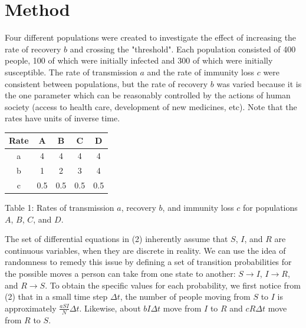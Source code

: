 \documentclass[prb,aps,twocolumn,showpacs,10pt]{revtex4-1}
\begin{document}
\section{Method}
Four different populations were created to investigate the effect of increasing the rate of recovery $b$ and crossing the "threshold". Each population consisted of 400 people, 100 of which were initially infected and 300 of which were initially susceptible. The rate of transmission $a$ and the rate of immunity loss $c$ were consistent between populations, but the rate of recovery $b$ was varied because it is the one parameter which can be reasonably controlled by the actions of human society (access to health care, development of new medicines, etc). Note that the rates have units of inverse time. \\
\begin{center}
\begin{tabular}{|c|c|c|c|c|}
\hline
\textbf{Rate}&\textbf{A}&\textbf{B}&\textbf{C}&\textbf{D}\\
\hline
\hline
a&4&4&4&4\\
\hline
b&1&2&3&4\\
\hline
c&0.5&0.5&0.5&0.5\\
\hline
\end{tabular}
\vspace*{5mm}

Table 1: Rates of transmission $a$, recovery $b$, and immunity loss $c$ for populations $A$, $B$, $C$, and $D$.
\end{center}

\vspace*{5mm}
The set of differential equations in (2) inherently assume that $S$, $I$, and $R$ are continuous variables, when they are discrete in reality. We can use the idea of randomness to remedy this issue by defining a set of transition probabilities for the possible moves a person can take from one state to another: $S\rightarrow I$, $I \rightarrow R$, and $R \rightarrow S$. To obtain the specific values for each probability, we first notice from (2) that in a small time step $\Delta t$, the number of people moving from $S$ to $I$ is approximately $\frac{aSI}{N}\Delta t$. Likewise, about $bI\Delta t$ move from $I$ to $R$ and $cR\Delta t$ move from $R$ to $S$. \\
\end{document}
